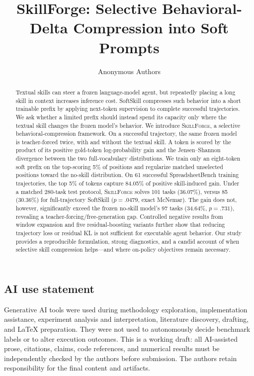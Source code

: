 \documentclass{article}
\title{SkillForge: Selective Behavioral-Delta Compression into Soft Prompts}
\author{Anonymous Authors}
\newcommand{\method}{\textsc{SkillForge}\xspace}
\begin{document}
\maketitle

\begin{abstract}
Textual skills can steer a frozen language-model agent, but repeatedly placing a long skill in context increases inference cost.  SoftSkill compresses such behavior into a short trainable prefix by applying next-token supervision to complete successful trajectories.  We ask whether a limited prefix should instead spend its capacity only where the textual skill changes the frozen model's behavior.  We introduce \method, a selective behavioral-compression framework.  On a successful trajectory, the same frozen model is teacher-forced twice, with and without the textual skill.  A token is scored by the product of its positive gold-token log-probability gain and the Jensen--Shannon divergence between the two full-vocabulary distributions.  We train only an eight-token soft prefix on the top-scoring 5\% of positions and regularize matched unselected positions toward the no-skill distribution.  On 61 successful SpreadsheetBench training trajectories, the top 5\% of tokens capture 84.05\% of positive skill-induced gain.  Under a matched 280-task test protocol, \method solves 101 tasks (36.07\%), versus 85 (30.36\%) for full-trajectory SoftSkill ($p=.0479$, exact McNemar).  The gain does not, however, significantly exceed the frozen no-skill model's 97 tasks (34.64\%, $p=.731$), revealing a teacher-forcing/free-generation gap.  Controlled negative results from window expansion and five residual-boosting variants further show that reducing trajectory loss or residual KL is not sufficient for executable agent behavior.  Our study provides a reproducible formulation, strong diagnostics, and a candid account of when selective skill compression helps---and where on-policy objectives remain necessary.
\end{abstract}









\subsection*{AI use statement}
Generative AI tools were used during methodology exploration, implementation assistance, experiment analysis and interpretation, literature discovery, drafting, and \LaTeX{} preparation.  They were not used to autonomously decide benchmark labels or to alter execution outcomes.  This is a working draft: all AI-assisted prose, citations, claims, code references, and numerical results must be independently checked by the authors before submission.  The authors retain responsibility for the final content and artifacts.
\end{document}
